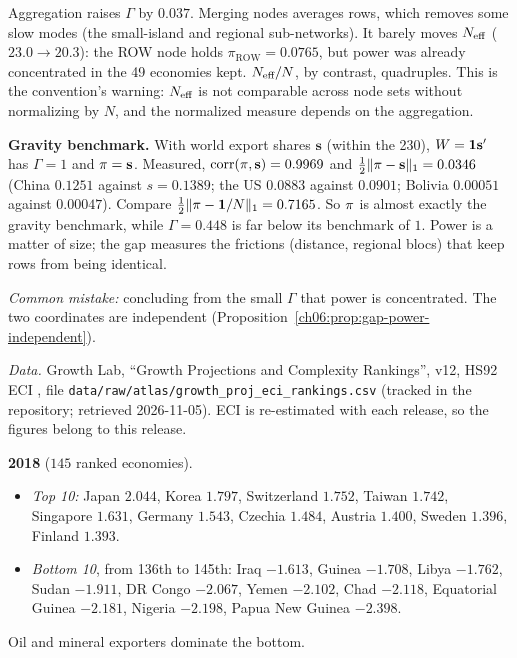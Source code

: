 \documentclass[../solutions_manual.tex]{subfiles}
\begin{document}
Aggregation raises $\Gamma$ by $0.037$. Merging nodes averages rows, which removes some slow modes (the small-island and regional sub-networks). It barely moves $N_{\text{eff}}$ ($23.0 \to 20.3$): the ROW node holds $\pi_{\text{ROW}} = 0.0765$, but power was already concentrated in the 49 economies kept. $N_{\text{eff}}/N$, by contrast, quadruples. This is the convention's warning: $N_{\text{eff}}$ is not comparable across node sets without normalizing by $N$, and the normalized measure depends on the aggregation.

\textbf{Gravity benchmark.} With world export shares $\mathbf{s}$ (within the 230), $W = \mathbf{1}\mathbf{s}'$ has $\Gamma = 1$ and $\pi = \mathbf{s}$. Measured, $\operatorname{corr}(\pi, \mathbf{s}) = 0.9969$ and $\frac12\|\pi - \mathbf{s}\|_1 = 0.0346$ (China $0.1251$ against $s = 0.1389$; the US $0.0883$ against $0.0901$; Bolivia $0.00051$ against $0.00047$). Compare $\frac12\|\pi - \mathbf{1}/N\|_1 = 0.7165$. So $\pi$ is almost exactly the gravity benchmark, while $\Gamma = 0.448$ is far below its benchmark of $1$. Power is a matter of size; the gap measures the frictions (distance, regional blocs) that keep rows from being identical.

\emph{Common mistake:} concluding from the small $\Gamma$ that power is concentrated. The two coordinates are independent (Proposition~\ref{ch06:prop:gap-power-independent}).


\emph{Data.} Growth Lab, ``Growth Projections and Complexity Rankings'', v12, HS92 ECI \citep{growthlab2026atlas}, file \nolinkurl{data/raw/atlas/growth_proj_eci_rankings.csv} (tracked in the repository; retrieved 2026-11-05). ECI is re-estimated with each release, so the figures belong to this release.

 \textbf{2018} ($145$ ranked economies).
\begin{itemize}
\item \emph{Top 10:} Japan $2.044$, Korea $1.797$, Switzerland $1.752$, Taiwan $1.742$, Singapore $1.631$, Germany $1.543$, Czechia $1.484$, Austria $1.400$, Sweden $1.396$, Finland $1.393$.
\item \emph{Bottom 10}, from 136th to 145th: Iraq $-1.613$, Guinea $-1.708$, Libya $-1.762$, Sudan $-1.911$, DR Congo $-2.067$, Yemen $-2.102$, Chad $-2.118$, Equatorial Guinea $-2.181$, Nigeria $-2.198$, Papua New Guinea $-2.398$.
\end{itemize}
Oil and mineral exporters dominate the bottom.
\end{document}
